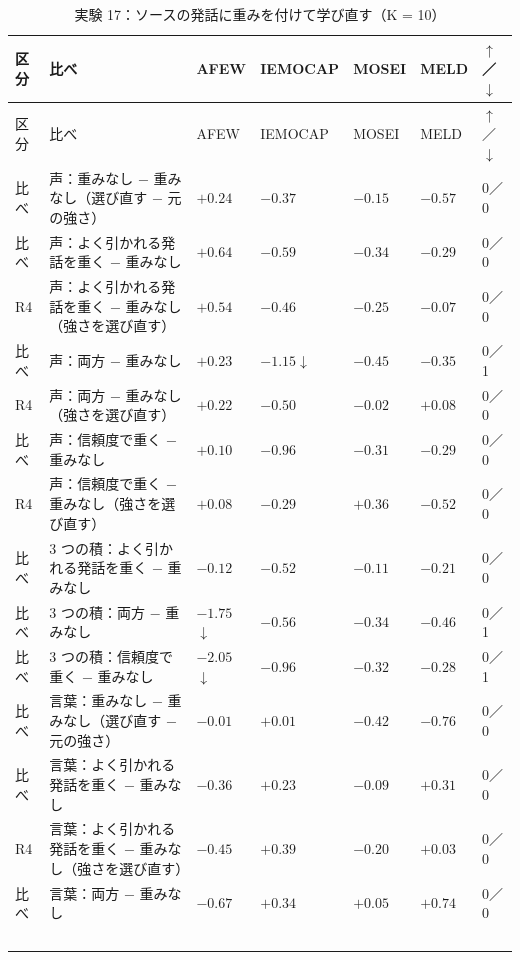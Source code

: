 \begin{longtable}{>{\raggedright}p{0.75cm}>{\raggedright}p{5.6cm}>{\raggedright}p{2.05cm}>{\raggedright}p{2.05cm}>{\raggedright}p{2.05cm}>{\raggedright}p{2.05cm}p{0.75cm}}
\caption{実験 17：ソースの発話に重みを付けて学び直す（K = 10）}\\
\toprule
区分 & 比べ & AFEW & IEMOCAP & MOSEI & MELD & $\uparrow$／$\downarrow$ \\
\midrule
\endfirsthead
\toprule
区分 & 比べ & AFEW & IEMOCAP & MOSEI & MELD & $\uparrow$／$\downarrow$ \\
\midrule
\endhead
\bottomrule
\endfoot

比べ & 声：重みなし $-$ 重みなし（選び直す $-$ 元の強さ） & $+0.24$ & $-0.37$ & $-0.15$ & $-0.57$ & 0／0 \\
比べ & 声：よく引かれる発話を重く $-$ 重みなし & $+0.64$ & $-0.59$ & $-0.34$ & $-0.29$ & 0／0 \\
R4 & 声：よく引かれる発話を重く $-$ 重みなし（強さを選び直す） & $+0.54$ & $-0.46$ & $-0.25$ & $-0.07$ & 0／0 \\
比べ & 声：両方 $-$ 重みなし & $+0.23$ & $-1.15$$\downarrow$ & $-0.45$ & $-0.35$ & 0／1 \\
R4 & 声：両方 $-$ 重みなし（強さを選び直す） & $+0.22$ & $-0.50$ & $-0.02$ & $+0.08$ & 0／0 \\
比べ & 声：信頼度で重く $-$ 重みなし & $+0.10$ & $-0.96$ & $-0.31$ & $-0.29$ & 0／0 \\
R4 & 声：信頼度で重く $-$ 重みなし（強さを選び直す） & $+0.08$ & $-0.29$ & $+0.36$ & $-0.52$ & 0／0 \\
比べ & 3 つの積：よく引かれる発話を重く $-$ 重みなし & $-0.12$ & $-0.52$ & $-0.11$ & $-0.21$ & 0／0 \\
比べ & 3 つの積：両方 $-$ 重みなし & $-1.75$$\downarrow$ & $-0.56$ & $-0.34$ & $-0.46$ & 0／1 \\
比べ & 3 つの積：信頼度で重く $-$ 重みなし & $-2.05$$\downarrow$ & $-0.96$ & $-0.32$ & $-0.28$ & 0／1 \\
比べ & 言葉：重みなし $-$ 重みなし（選び直す $-$ 元の強さ） & $-0.01$ & $+0.01$ & $-0.42$ & $-0.76$ & 0／0 \\
比べ & 言葉：よく引かれる発話を重く $-$ 重みなし & $-0.36$ & $+0.23$ & $-0.09$ & $+0.31$ & 0／0 \\
R4 & 言葉：よく引かれる発話を重く $-$ 重みなし（強さを選び直す） & $-0.45$ & $+0.39$ & $-0.20$ & $+0.03$ & 0／0 \\
比べ & 言葉：両方 $-$ 重みなし & $-0.67$ & $+0.34$ & $+0.05$ & $+0.74$ & 0／0 \\
$$
\end{longtable}
